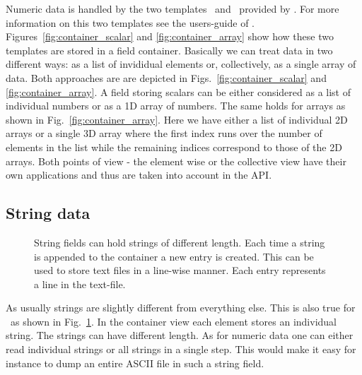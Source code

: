 Numeric data is handled by the two templates \arrayt\ and \scalart\  
provided by \pniutils. For more information on this two templates see 
the users-guide of \pniutils.
Figures~\ref{fig:container_scalar} and \ref{fig:container_array} show how these 
two templates are stored in a field container. 
Basically we can treat data in two different ways: as a list of invididual
elements or, collectively, as a single array of data. 
Both approaches are are depicted in Figs.~\ref{fig:container_scalar} and 
\ref{fig:container_array}. A field storing scalars can be either considered 
as a list of individual numbers or as a 1D array of numbers. 
The same holds for arrays as shown in Fig.~\ref{fig:container_array}. Here 
we have either a list of individual 2D arrays or a single 3D array where the 
first index runs over the number of elements in the list while the remaining 
indices correspond to those of the 2D arrays.
Both points of view - the element wise or the collective view have their own 
applications and thus are taken into account in the API. 

\subsection{String data}
\begin{figure}[tb]
\centering
\begin{minipage}[c]{0.4\linewidth}
\centering
{}
\end{minipage}
\hfill
\begin{minipage}[c]{0.58\linewidth}
\caption{{\small\label{fig:container_string} String fields can hold strings 
of different length. Each time a string is appended to the container 
a new entry is created. This can be used to store text files in a line-wise
manner. Each entry represents a line in the text-file.}}
\end{minipage}
\end{figure}
As usually strings are slightly different from everything else. 
This is also true for \pninx\ as shown in Fig.~\ref{fig:container_string}.
In the container view each element stores an individual string. The strings 
can have different length. 
As for numeric data one can either read individual strings or all strings 
in a single step. This would make it easy for instance to dump an entire 
ASCII file in such a string field. 

